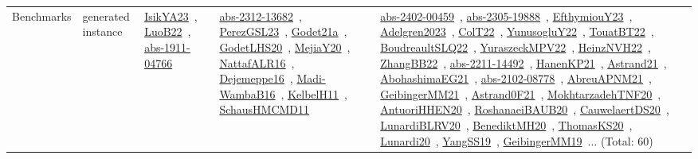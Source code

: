 {\begin{longtable}{lp{3cm}>{\raggedright\arraybackslash}p{6cm}>{\raggedright\arraybackslash}p{6cm}>{\raggedright\arraybackslash}p{8cm}}
Benchmarks & generated instance & \href{../works/IsikYA23.pdf}{IsikYA23}~\cite{IsikYA23}, \href{../works/LuoB22.pdf}{LuoB22}~\cite{LuoB22}, \href{../works/abs-1911-04766.pdf}{abs-1911-04766}~\cite{abs-1911-04766} & \href{../works/abs-2312-13682.pdf}{abs-2312-13682}~\cite{abs-2312-13682}, \href{../works/PerezGSL23.pdf}{PerezGSL23}~\cite{PerezGSL23}, \href{../works/Godet21a.pdf}{Godet21a}~\cite{Godet21a}, \href{../works/GodetLHS20.pdf}{GodetLHS20}~\cite{GodetLHS20}, \href{../works/MejiaY20.pdf}{MejiaY20}~\cite{MejiaY20}, \href{../works/NattafALR16.pdf}{NattafALR16}~\cite{NattafALR16}, \href{../works/Dejemeppe16.pdf}{Dejemeppe16}~\cite{Dejemeppe16}, \href{../works/Madi-WambaB16.pdf}{Madi-WambaB16}~\cite{Madi-WambaB16}, \href{../works/KelbelH11.pdf}{KelbelH11}~\cite{KelbelH11}, \href{../works/SchausHMCMD11.pdf}{SchausHMCMD11}~\cite{SchausHMCMD11} & \href{../works/abs-2402-00459.pdf}{abs-2402-00459}~\cite{abs-2402-00459}, \href{../works/abs-2305-19888.pdf}{abs-2305-19888}~\cite{abs-2305-19888}, \href{../works/EfthymiouY23.pdf}{EfthymiouY23}~\cite{EfthymiouY23}, \href{../works/Adelgren2023.pdf}{Adelgren2023}~\cite{Adelgren2023}, \href{../works/ColT22.pdf}{ColT22}~\cite{ColT22}, \href{../works/YunusogluY22.pdf}{YunusogluY22}~\cite{YunusogluY22}, \href{../works/TouatBT22.pdf}{TouatBT22}~\cite{TouatBT22}, \href{../works/BoudreaultSLQ22.pdf}{BoudreaultSLQ22}~\cite{BoudreaultSLQ22}, \href{../works/YuraszeckMPV22.pdf}{YuraszeckMPV22}~\cite{YuraszeckMPV22}, \href{../works/HeinzNVH22.pdf}{HeinzNVH22}~\cite{HeinzNVH22}, \href{../works/ZhangBB22.pdf}{ZhangBB22}~\cite{ZhangBB22}, \href{../works/abs-2211-14492.pdf}{abs-2211-14492}~\cite{abs-2211-14492}, \href{../works/HanenKP21.pdf}{HanenKP21}~\cite{HanenKP21}, \href{../works/Astrand21.pdf}{Astrand21}~\cite{Astrand21}, \href{../works/AbohashimaEG21.pdf}{AbohashimaEG21}~\cite{AbohashimaEG21}, \href{../works/abs-2102-08778.pdf}{abs-2102-08778}~\cite{abs-2102-08778}, \href{../works/AbreuAPNM21.pdf}{AbreuAPNM21}~\cite{AbreuAPNM21}, \href{../works/GeibingerMM21.pdf}{GeibingerMM21}~\cite{GeibingerMM21}, \href{../works/Astrand0F21.pdf}{Astrand0F21}~\cite{Astrand0F21}, \href{../works/MokhtarzadehTNF20.pdf}{MokhtarzadehTNF20}~\cite{MokhtarzadehTNF20}, \href{../works/AntuoriHHEN20.pdf}{AntuoriHHEN20}~\cite{AntuoriHHEN20}, \href{../works/RoshanaeiBAUB20.pdf}{RoshanaeiBAUB20}~\cite{RoshanaeiBAUB20}, \href{../works/CauwelaertDS20.pdf}{CauwelaertDS20}~\cite{CauwelaertDS20}, \href{../works/LunardiBLRV20.pdf}{LunardiBLRV20}~\cite{LunardiBLRV20}, \href{../works/BenediktMH20.pdf}{BenediktMH20}~\cite{BenediktMH20}, \href{../works/ThomasKS20.pdf}{ThomasKS20}~\cite{ThomasKS20}, \href{../works/Lunardi20.pdf}{Lunardi20}~\cite{Lunardi20}, \href{../works/YangSS19.pdf}{YangSS19}~\cite{YangSS19}, \href{../works/GeibingerMM19.pdf}{GeibingerMM19}~\cite{GeibingerMM19}... (Total: 60)\\

\end{longtable}}
